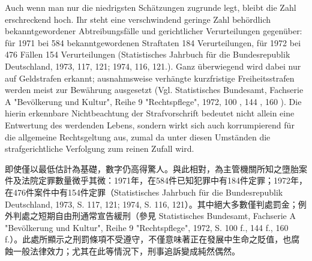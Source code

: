 \documentclass[12pt]{article}
\begin{document}
\syncleft
\begin{sourcepara}
Auch wenn man nur die niedrigsten Schätzungen zugrunde legt, bleibt die Zahl erschreckend hoch. Ihr steht eine verschwindend geringe Zahl behördlich bekanntgewordener Abtreibungsfälle und gerichtlicher Verurteilungen gegenüber: für 1971 bei 584 bekanntgewordenen Straftaten 184 Verurteilungen, für 1972 bei 476 Fällen 154 Verurteilungen (Statistisches Jahrbuch für die Bundesrepublik Deutschland, 1973, \abbrS{} 117, 121; 1974, \abbrS{} 116, 121.). Ganz überwiegend wird dabei nur auf Geldstrafen erkannt; ausnahmsweise verhängte kurzfristige Freiheitsstrafen werden meist zur Bewährung ausgesetzt (Vgl. Statistisches Bundesamt, Fachserie A "Bevölkerung und Kultur", Reihe 9 "Rechtspflege", 1972, \abbrS{} 100 \abbrF{}, 144 \abbrF{}, 160 \abbrF{}). Die hierin erkennbare Nichtbeachtung der Strafvorschrift bedeutet nicht allein eine Entwertung des werdenden Lebens, sondern wirkt sich auch korrumpierend für die allgemeine Rechtsgeltung aus, zumal da unter diesen Umständen die strafgerichtliche Verfolgung zum reinen Zufall wird.
\end{sourcepara}
\begin{transpara}
即使僅以最低估計為基礎，數字仍高得驚人。與此相對，為主管機關所知之墮胎案件及法院定罪數量微乎其微：1971年，在584件已知犯罪中有184件定罪；1972年，在476件案件中有154件定罪（Statistisches Jahrbuch für die Bundesrepublik Deutschland, 1973, S. 117, 121; 1974, S. 116, 121）。其中絕大多數僅判處罰金；例外判處之短期自由刑通常宣告緩刑（參見 Statistisches Bundesamt, Fachserie A "Bevölkerung und Kultur", Reihe 9 "Rechtspflege", 1972, S. 100 f., 144 f., 160 f.）。此處所顯示之刑罰條項不受遵守，不僅意味著正在發展中生命之貶值，也腐蝕一般法律效力；尤其在此等情況下，刑事追訴變成純然偶然。
\end{transpara}
\end{document}
